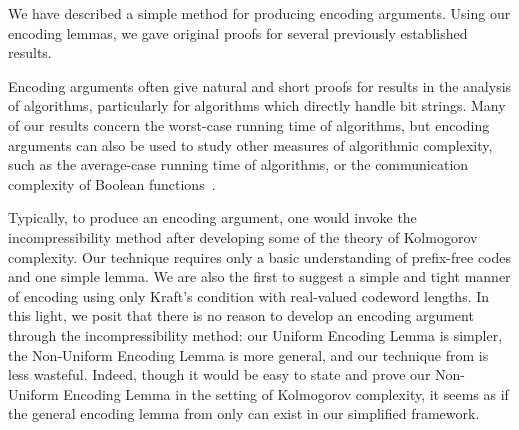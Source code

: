 \documentclass[format=acmsmall, review=false, screen=true]{acmart}
\begin{document}
We have described a simple method for producing encoding
arguments. Using our encoding lemmas, we gave original proofs for
several previously established results.

Encoding arguments often give natural and short proofs for results in
the analysis of algorithms, particularly for algorithms which directly
handle bit strings. Many of our results concern the worst-case running
time of algorithms, but encoding arguments can also be used to study
other measures of algorithmic complexity, such as the average-case
running time of algorithms, or the communication complexity of Boolean
functions~\cite{buhrman:newapps}.

Typically, to produce an encoding argument, one would invoke the
incompressibility method after developing some of the theory of
Kolmogorov complexity. Our technique requires only a basic
understanding of prefix-free codes and one simple lemma. We are also
the first to suggest a simple and tight manner of encoding using only
Kraft's condition with real-valued codeword lengths. In this light, we
posit that there is no reason to develop an encoding argument through
the incompressibility method: our Uniform Encoding Lemma is simpler,
the Non-Uniform Encoding Lemma is more general, and our technique from
 is less wasteful. Indeed, though it would be easy to state
and prove our Non-Uniform Encoding Lemma in the setting of Kolmogorov
complexity, it seems as if the general encoding lemma from 
only can exist in our simplified framework.

\end{document}
